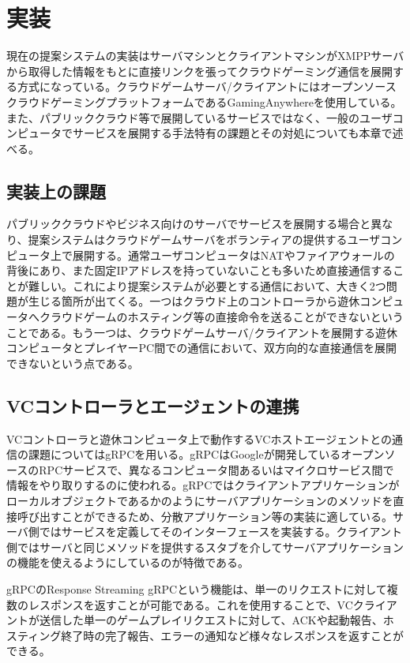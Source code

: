 \section{実装}

現在の提案システムの実装はサーバマシンとクライアントマシンがXMPPサーバから取得した情報をもとに直接リンクを張ってクラウドゲーミング通信を展開する方式になっている。クラウドゲームサーバ/クライアントにはオープンソースクラウドゲーミングプラットフォームであるGamingAnywhereを使用している。また、パブリッククラウド等で展開しているサービスではなく、一般のユーザコンピュータでサービスを展開する手法特有の課題とその対処についても本章で述べる。

\subsection{実装上の課題}
パブリッククラウドやビジネス向けのサーバでサービスを展開する場合と異なり、提案システムはクラウドゲームサーバをボランティアの提供するユーザコンピュータ上で展開する。通常ユーザコンピュータはNATやファイアウォールの背後にあり、また固定IPアドレスを持っていないことも多いため直接通信することが難しい。これにより提案システムが必要とする通信において、大きく2つ問題が生じる箇所が出てくる。一つはクラウド上のコントローラから遊休コンピュータへクラウドゲームのホスティング等の直接命令を送ることができないということである。もう一つは、クラウドゲームサーバ/クライアントを展開する遊休コンピュータとプレイヤーPC間での通信において、双方向的な直接通信を展開できないという点である。

\subsection{VCコントローラとエージェントの連携}
VCコントローラと遊休コンピュータ上で動作するVCホストエージェントとの通信の課題についてはgRPC\cite{grpc}を用いる。gRPCはGoogleが開発しているオープンソースのRPCサービスで、異なるコンピュータ間あるいはマイクロサービス間で情報をやり取りするのに使われる。gRPCではクライアントアプリケーションがローカルオブジェクトであるかのようにサーバアプリケーションのメソッドを直接呼び出すことができるため、分散アプリケーション等の実装に適している。サーバ側ではサービスを定義してそのインターフェースを実装する。クライアント側ではサーバと同じメソッドを提供するスタブを介してサーバアプリケーションの機能を使えるようにしているのが特徴である。

gRPCのResponse Streaming gRPCという機能は、単一のリクエストに対して複数のレスポンスを返すことが可能である。これを使用することで、VCクライアントが送信した単一のゲームプレイリクエストに対して、ACKや起動報告、ホスティング終了時の完了報告、エラーの通知など様々なレスポンスを返すことができる。

